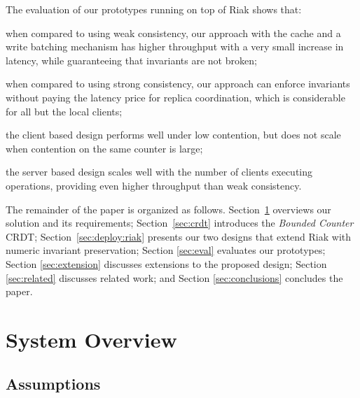 \documentclass[conference]{IEEEtran}
\newcommand{\InvCounter}{\emph{Bounded Counter}}
\begin{document}
The evaluation of our prototypes running on top of Riak shows that: 
\begin{inparaenum}
\item when compared to using weak consistency, our approach 
with the cache and a write batching mechanism has higher
throughput with a very small increase in latency, while 
guaranteeing that invariants are not broken;
\item when compared to using strong consistency, our approach can 
enforce invariants without paying the latency price for replica coordination,
which is considerable for all but the local clients;
\item the client based design performs well under low contention, 
but does not scale when contention on the same counter is large;
\item the server based design scales well with the number of clients 
executing operations, providing even higher throughput than 
weak consistency.
\end{inparaenum}


















The remainder of the paper is organized as follows. 
Section~\ref{sec:model} overviews our solution and its requirements; 
Section~\ref{sec:crdt} introduces the \InvCounter{} CRDT; 
Section~\ref{sec:deploy:riak} presents our two designs that extend Riak with numeric invariant preservation; 
Section \ref{sec:eval} evaluates our prototypes; 
Section \ref{sec:extension} discusses extensions to the proposed design; 
Section \ref{sec:related} discusses related work; and 
Section \ref{sec:conclusions} concludes the paper.








\section{System Overview}\label{sec:model}



\subsection{Assumptions}
\end{document}
